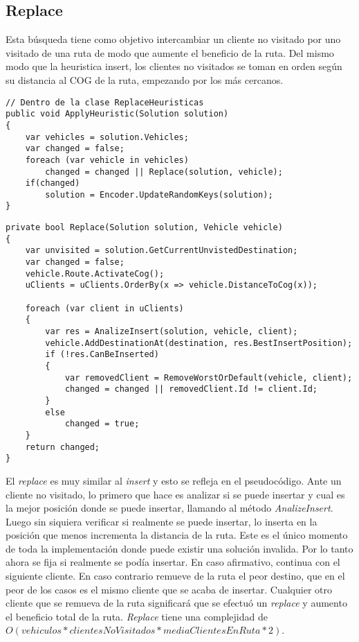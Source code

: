 \subsection{Replace}

Esta búsqueda tiene como objetivo intercambiar un cliente no visitado por uno visitado de una ruta de modo que aumente el beneficio de la ruta. Del mismo modo que la heuristica insert, los clientes no visitados se toman en orden según su distancia al COG de la ruta, empezando por los más cercanos.

\begin{minipage}{\textwidth}
\begin{lstlisting}
// Dentro de la clase ReplaceHeuristicas
public void ApplyHeuristic(Solution solution)
{	
	var vehicles = solution.Vehicles;
	var changed = false;	
	foreach (var vehicle in vehicles)
		changed = changed || Replace(solution, vehicle);
	if(changed)
		solution = Encoder.UpdateRandomKeys(solution);
}
\end{lstlisting}
\end{minipage}

\begin{minipage}{\textwidth}
\begin{lstlisting}
private bool Replace(Solution solution, Vehicle vehicle)
{
	var unvisited = solution.GetCurrentUnvistedDestination;
	var changed = false;
	vehicle.Route.ActivateCog();
	uClients = uClients.OrderBy(x => vehicle.DistanceToCog(x));	

	foreach (var client in uClients)
	{
		var res = AnalizeInsert(solution, vehicle, client);
		vehicle.AddDestinationAt(destination, res.BestInsertPosition);
		if (!res.CanBeInserted)
		{
			var removedClient = RemoveWorstOrDefault(vehicle, client);
			changed = changed || removedClient.Id != client.Id;
		}
		else
			changed = true;
	}
	return changed;
}
\end{lstlisting}
\end{minipage}

\bigskip

El \textit{replace} es muy similar al \textit{insert} y esto se refleja en el pseudocódigo. Ante un cliente no visitado, lo primero que hace es analizar si se puede insertar y cual es la mejor posición donde se puede insertar, llamando al método \textit{AnalizeInsert}. Luego sin siquiera verificar si realmente se puede insertar, lo inserta en la posición que menos incrementa la distancia de la ruta. Este es el único momento de toda la implementación donde puede existir una solución invalida. Por lo tanto ahora se fija si realmente se podía insertar. En caso afirmativo, continua con el siguiente cliente. En caso contrario remueve de la ruta el peor destino, que en el peor de los casos es el mismo cliente que se acaba de insertar. Cualquier otro cliente que se remueva de la ruta significará que se efectuó un \textit{replace} y aumento el beneficio total de la ruta. \textit{Replace} tiene una complejidad de $O(vehiculos * clientesNoVisitados * mediaClientesEnRuta * 2)$. 

